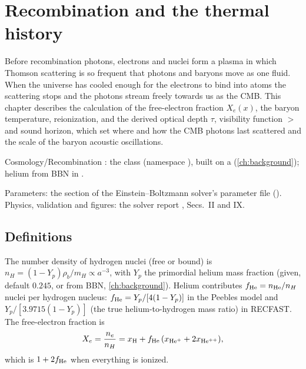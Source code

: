 \chapter{Recombination and the thermal history}\label{ch:recombination}

Before recombination photons, electrons and nuclei form a plasma in which Thomson scattering is so frequent that
photons and baryons move as one fluid. When the universe has cooled enough for the electrons to bind into atoms the
scattering stops and the photons stream freely towards us as the CMB. This chapter describes the calculation of the
free-electron fraction $X_e(x)$, the baryon temperature, reionization, and the derived optical depth $\tau$,
visibility function $\gt$ and sound horizon, which set where and how the CMB photons last scattered and the scale of
the baryon acoustic oscillations.

\begin{modulebox}{Cosmology/Recombination}
: the class  (namespace
), built on a  (\cref{ch:background}); helium from BBN in
.\par
Parameters: the  section of the Einstein--Boltzmann solver's parameter file
(). Physics, validation and figures: the solver report
, Secs.~II and IX.
\end{modulebox}

\section{Definitions}

The number density of hydrogen nuclei (free or bound) is $n_H=(1-Y_p)\rho_b/m_H\propto a^{-3}$, with $Y_p$ the
primordial helium mass fraction (given, default $0.245$, or from BBN, \cref{ch:background}). Helium contributes
$f_{\rm He}=n_{\rm He}/n_H$ nuclei per hydrogen nucleus: $f_{\rm He}=Y_p/[4(1-Y_p)]$ in the Peebles model and
$Y_p/[3.9715(1-Y_p)]$ (the true helium-to-hydrogen mass ratio) in RECFAST. The free-electron fraction is
\begin{equation}
X_e=\frac{n_e}{n_H}=x_{\rm H}+f_{\rm He}\,(x_{\rm He^+}+2x_{\rm He^{++}}),
\end{equation}
which is $1+2f_{\rm He}$ when everything is ionized.

